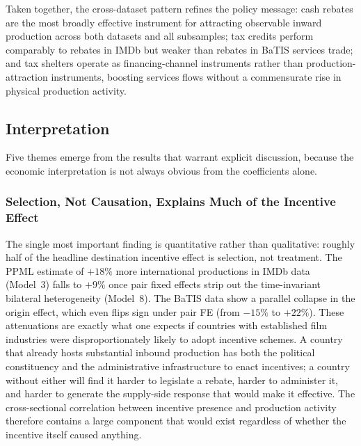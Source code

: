Taken together, the cross-dataset pattern refines the policy message: cash rebates are the most broadly effective instrument for attracting observable inward production across both datasets and all subsamples; tax credits perform comparably to rebates in IMDb but weaker than rebates in BaTIS services trade; and tax shelters operate as financing-channel instruments rather than production-attraction instruments, boosting services flows without a commensurate rise in physical production activity.

\subsection{Interpretation}
\label{sec:interpretation}

Five themes emerge from the results that warrant explicit discussion, because the economic interpretation is not always obvious from the coefficients alone.

\subsubsection{Selection, Not Causation, Explains Much of the Incentive Effect}

The single most important finding is quantitative rather than qualitative: roughly half of the headline destination incentive effect is selection, not treatment. The PPML estimate of $+18\%$ more international productions in IMDb data (Model~3) falls to $+9\%$ once pair fixed effects strip out the time-invariant bilateral heterogeneity (Model~8). The BaTIS data show a parallel collapse in the origin effect, which even flips sign under pair FE (from $-15\%$ to $+22\%$). These attenuations are exactly what one expects if countries with established film industries were disproportionately likely to adopt incentive schemes. A country that already hosts substantial inbound production has both the political constituency and the administrative infrastructure to enact incentives; a country without either will find it harder to legislate a rebate, harder to administer it, and harder to generate the supply-side response that would make it effective. The cross-sectional correlation between incentive presence and production activity therefore contains a large component that would exist regardless of whether the incentive itself caused anything.

